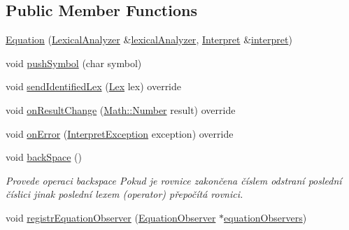 \subsection*{Public Member Functions}
\begin{DoxyCompactItemize}
\item 
\hyperlink{classteam22_1_1_calc_1_1_equation_a085dc8be6e009511735b8c317d951610}{Equation} (\hyperlink{classteam22_1_1_calc_1_1_lexical_analyzer}{Lexical\+Analyzer} \&\hyperlink{classteam22_1_1_calc_1_1_equation_a65aeaa2a279994b03517a22addf31fc1}{lexical\+Analyzer}, \hyperlink{classteam22_1_1_calc_1_1_interpret}{Interpret} \&\hyperlink{classteam22_1_1_calc_1_1_equation_a8812a84e9c0f194eba491b0dba0cb015}{interpret})
\item 
void \hyperlink{classteam22_1_1_calc_1_1_equation_a324bf6372508c1b931c5ad8f39ccf8c4}{push\+Symbol} (char symbol)
\item 
void \hyperlink{classteam22_1_1_calc_1_1_equation_ad5768951865500ec7fc514f676de2851}{send\+Identified\+Lex} (\hyperlink{classteam22_1_1_calc_1_1_lex}{Lex} lex) override
\item 
void \hyperlink{classteam22_1_1_calc_1_1_equation_a302c295e099f589897a1bad4b02d3de8}{on\+Result\+Change} (\hyperlink{classteam22_1_1_math_1_1_number}{Math\+::\+Number} result) override
\item 
void \hyperlink{classteam22_1_1_calc_1_1_equation_a4e7a0614867931bcc714440441cdd894}{on\+Error} (\hyperlink{class_interpret_exception}{Interpret\+Exception} exception) override
\item 
void \hyperlink{classteam22_1_1_calc_1_1_equation_acccaaf8d823e6f1b7f6831fc0c8c4a62}{back\+Space} ()
\begin{DoxyCompactList}\small\item\em Provede operaci backspace Pokud je rovnice zakončena číslem odstraní poslední číslici jinak poslední lexem (operator) přepočítá rovnici. \end{DoxyCompactList}\item 
void \hyperlink{classteam22_1_1_calc_1_1_equation_a705c26d64f67f673e4919494d7e22d4a}{registr\+Equation\+Observer} (\hyperlink{classteam22_1_1_calc_1_1_equation_observer}{Equation\+Observer} $\ast$\hyperlink{classteam22_1_1_calc_1_1_equation_a76439666b11701dd1c42507397c5a316}{equation\+Observers})
\end{DoxyCompactItemize}

